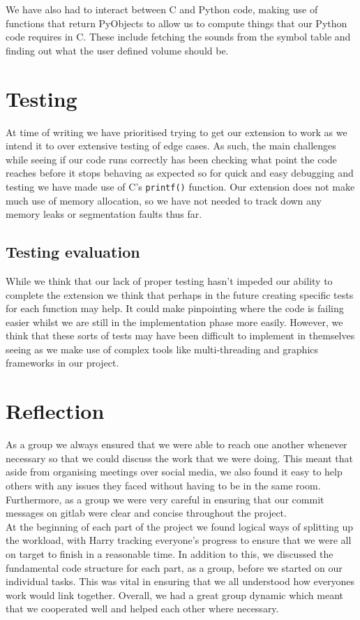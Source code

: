 \documentclass[11pt]{article}
\begin{document}
	We have also had to interact between C and Python code, making use of functions that return PyObjects to allow us to compute things that our Python code requires in C. These include fetching the sounds from the symbol table and finding out what the user defined volume should be.

\section{Testing}
	At time of writing we have prioritised trying to get our extension to work as we intend it to over extensive testing of edge cases. As such, the main challenges while seeing if our code runs correctly has been checking what point the code reaches before it stops behaving as expected so for quick and easy debugging and testing we have made use of C's  \texttt{printf()} function. Our extension does not make much use of memory allocation, so we have not needed to track down any memory leaks or segmentation faults thus far.

\subsection{Testing evaluation}
While we think that our lack of proper testing hasn't impeded our ability to complete the extension we think that perhaps in the future creating specific tests for each function may help. It could make pinpointing where the code is failing easier whilst we are still in the implementation phase more easily. However, we think that these sorts of tests may have been difficult to implement in themselves seeing as we make use of complex tools like multi-threading and graphics frameworks in our project.

\section{Reflection}
As a group we always ensured that we were able to reach one another whenever necessary so that we could discuss the work that we were doing. This meant that aside from organising meetings over social media, we also found it easy to help others with any issues they faced without having to be in the same room. Furthermore, as a group we were very careful in ensuring that our commit messages on gitlab were clear and concise throughout the project.\\

At the beginning of each part of the project we found logical ways of splitting up the workload, with Harry tracking everyone's progress to ensure that we were all on target to finish in a reasonable time. In addition to this, we discussed the fundamental code structure for each part, as a group, before we started on our individual tasks. This was vital in ensuring that we all understood how everyones work would link together. Overall, we had a great group dynamic which meant that we cooperated well and helped each other where necessary. \\
\end{document}
